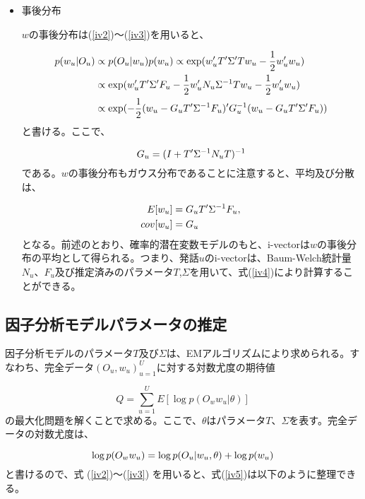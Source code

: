 \begin{itemize}
\item 事後分布\par
$w$の事後分布は(\ref{iv2})〜(\ref{iv3})を用いると、

\begin{align}
p(w_u|O_u) &\propto p(O_u|w_u)p(w_u)\propto \exp(w_u^\prime T^\prime \Sigma^\prime Tw_u-\frac{1}{2}w_u^\prime w_u) \notag \\ 
 &\propto \exp(w_u^\prime T^\prime \Sigma^\prime F_u-\frac{1}{2}w_u^\prime N_u\Sigma^{-1}Tw_u-\frac{1}{2}w_u^\prime w_u) \notag \\ 
 &\propto \exp(-\frac{1}{2}(w_u-G_uT^\prime\Sigma^{-1}F_u)^\prime G_u^{-1}(w_u-G_uT^\prime \Sigma^\prime F_u)) \notag
\end{align}
と書ける。ここで、

\begin{equation}
G_u=(I+T^\prime \Sigma^{-1}N_u T)^{-1} \notag
\end{equation}
である。$w$の事後分布もガウス分布であることに注意すると、平均及び分散は、

\begin{align}
\label{iv4}
E[w_u] &=G_uT^\prime \Sigma^{-1}F_u, \\
cov[w_u] &=G_u \notag
\end{align}
となる。前述のとおり、確率的潜在変数モデルのもと、i-vectorは$w$の事後分布の平均として得られる。つまり、発話$u$のi-vectorは、Baum-Welch統計量$N_u$、$F_u$及び推定済みのパラメータ$T$,$\Sigma$を用いて、式(\ref{iv4})により計算することができる。

\end{itemize}


\subsection{因子分析モデルパラメータの推定}
因子分析モデルのパラメータ$T$及び$\Sigma$は、EMアルゴリズムにより求められる。すなわち、完全データ${(O_u,w_u)}_{u=1}^{U}$に対する対数尤度の期待値

\begin{equation}
\label{iv5}
Q=\sum_{u=1}^{U}E[\log p(O_ww_u|\theta)]
\end{equation}
の最大化問題を解くことで求める。ここで、$\theta$はパラメータ$T$、$\Sigma$を表す。完全データの対数尤度は、

\begin{equation}
\log p(O_w w_u)=\log p(O_u|w_u,\theta)+\log p(w_u) \notag
\end{equation}
と書けるので、式 (\ref{iv2})〜(\ref{iv3}) を用いると、式(\ref{iv5})は以下のように整理できる。

